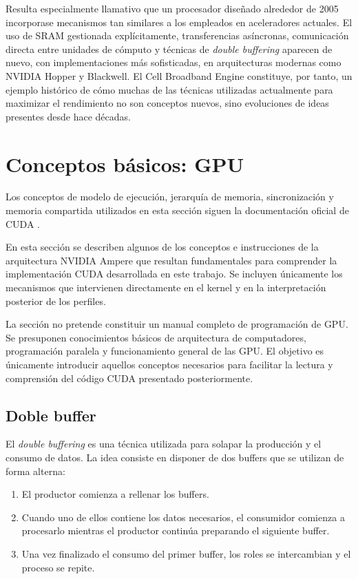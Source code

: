 Resulta especialmente llamativo que un procesador diseñado alrededor de 2005 incorporase mecanismos tan similares a los empleados en aceleradores actuales. El uso de SRAM gestionada explícitamente, transferencias asíncronas, comunicación directa entre unidades de cómputo y técnicas de \textit{double buffering} aparecen de nuevo, con implementaciones más sofisticadas, en arquitecturas modernas como NVIDIA Hopper y Blackwell. El Cell Broadband Engine constituye, por tanto, un ejemplo histórico de cómo muchas de las técnicas utilizadas actualmente para maximizar el rendimiento no son conceptos nuevos, sino evoluciones de ideas presentes desde hace décadas.

\section{Conceptos básicos: GPU}
Los conceptos de modelo de ejecución, jerarquía de memoria, sincronización y memoria compartida utilizados en esta sección siguen la documentación oficial de CUDA \cite{cudaProgrammingGuide}.


En esta sección se describen algunos de los conceptos e instrucciones de la arquitectura NVIDIA Ampere que resultan fundamentales para comprender la implementación CUDA desarrollada en este trabajo. Se incluyen únicamente los mecanismos que intervienen directamente en el kernel y en la interpretación posterior de los perfiles.

La sección no pretende constituir un manual completo de programación de GPU. Se presuponen conocimientos básicos de arquitectura de computadores, programación paralela y funcionamiento general de las GPU. El objetivo es únicamente introducir aquellos conceptos necesarios para facilitar la lectura y comprensión del código CUDA presentado posteriormente.

\subsection{Doble buffer}

El \textit{double buffering} es una técnica utilizada para solapar la producción y el consumo de datos. La idea consiste en disponer de dos buffers que se utilizan de forma alterna:

\begin{enumerate}
\item El productor comienza a rellenar los buffers.
\item Cuando uno de ellos contiene los datos necesarios, el consumidor comienza a procesarlo mientras el productor continúa preparando el siguiente buffer.
\item Una vez finalizado el consumo del primer buffer, los roles se intercambian y el proceso se repite.
\end{enumerate}

